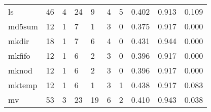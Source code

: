 \begin{longtable}{lp{1.3cm}p{1.3cm}p{1.3cm}p{1.3cm}p{1.3cm}p{1.3cm}p{1.3cm}p{1.3cm}p{1.3cm}}
ls        &                     46 &                                             4 &                                           24 &                                           9 &                                            4 &                                          5 &                                0.402 &                                  0.913 &                                0.109 \\
md5sum    &                     12 &                                             1 &                                            7 &                                           1 &                                            3 &                                          0 &                                0.375 &                                  0.917 &                                0.000 \\
mkdir     &                     18 &                                             1 &                                            7 &                                           6 &                                            4 &                                          0 &                                0.431 &                                  0.944 &                                0.000 \\
mkfifo    &                     12 &                                             1 &                                            6 &                                           2 &                                            3 &                                          0 &                                0.396 &                                  0.917 &                                0.000 \\
mknod     &                     12 &                                             1 &                                            6 &                                           2 &                                            3 &                                          0 &                                0.396 &                                  0.917 &                                0.000 \\
mktemp    &                     12 &                                             1 &                                            6 &                                           1 &                                            3 &                                          1 &                                0.438 &                                  0.917 &                                0.083 \\
mv        &                     53 &                                             3 &                                           23 &                                          19 &                                            6 &                                          2 &                                0.410 &                                  0.943 &                                0.038 \\

\end{longtable}

